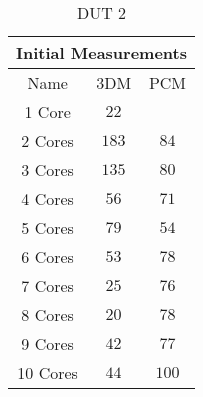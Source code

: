 \begin{table}[H]
    \centering
    \begin{tabular}{|| c | c | c ||}
    \hline
    \multicolumn{3}{||c||}{Initial Measurements} \\ [0.5ex] \hline\hline
    Name & 3DM & PCM \\\hline
    1 Core& $22$ &  \\
    2 Cores& $183$ & $84$ \\
    3 Cores& $135$ & $80$ \\
    4 Cores& $56$ & $71$ \\
    5 Cores& $79$ & $54$ \\
    6 Cores& $53$ & $78$ \\
    7 Cores& $25$ & $76$ \\
    8 Cores& $20$ & $78$ \\
    9 Cores& $42$ & $77$ \\
    10 Cores& $44$ & $100$ \\\hline
    \end{tabular}
    \caption{DUT 2}
    \label{tab:initial-measurements-exp-3-dut-2-app}
\end{table}